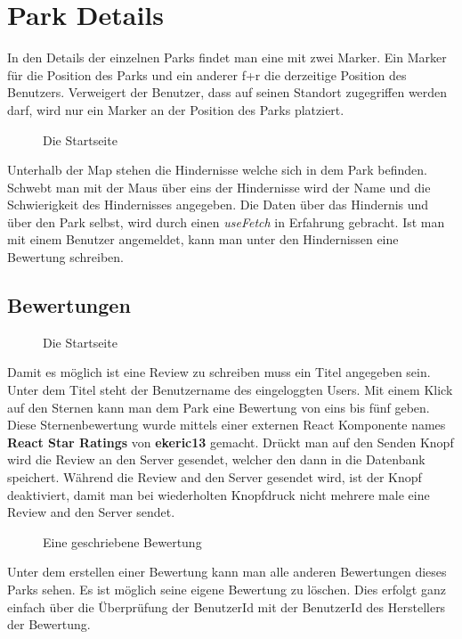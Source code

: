 \section{Park Details}
\label{parkDetails}

In den Details der einzelnen Parks findet man eine  mit zwei Marker. Ein Marker für die 
Position des Parks und ein anderer f+r die derzeitige Position des Benutzers. Verweigert der 
Benutzer, dass auf seinen Standort zugegriffen werden darf, wird nur ein Marker an der Position des
Parks platziert.

\begin{figure}[H]
    \begin{center}
      \caption{Die Startseite}
    \end{center}
\end{figure}

Unterhalb der Map stehen die Hindernisse welche sich in dem Park befinden. Schwebt man mit der Maus 
über eins der Hindernisse wird der Name und die Schwierigkeit des Hindernisses angegeben. Die Daten 
über das Hindernis und über den Park selbst, wird durch einen \textit{useFetch} in Erfahrung 
gebracht. Ist man mit einem Benutzer angemeldet, kann man unter den Hindernissen eine Bewertung 
schreiben.
\pagebreak
\subsection{Bewertungen}

\begin{figure}[H]
  \begin{center}
    \caption{Die Startseite}
  \end{center}
\end{figure}

Damit es möglich ist eine Review zu schreiben muss ein Titel angegeben sein. Unter dem Titel steht 
der Benutzername des eingeloggten Users. Mit einem Klick auf den Sternen kann man dem Park eine 
Bewertung von eins bis fünf geben. Diese Sternenbewertung wurde mittels einer externen React 
Komponente names \textbf{React Star Ratings} von \textbf{ekeric13} gemacht. Drückt man auf den 
Senden Knopf wird die Review an den Server gesendet, welcher den dann in die Datenbank speichert. 
Während die Review and den Server gesendet wird, ist der Knopf deaktiviert, damit man bei wiederholten 
Knopfdruck nicht mehrere male eine Review and den Server sendet.

\begin{figure}[H]
  \begin{center}
    \caption{Eine geschriebene Bewertung}
  \end{center}
\end{figure}

Unter dem erstellen einer Bewertung kann man alle anderen Bewertungen dieses Parks sehen. Es ist möglich 
seine eigene Bewertung zu löschen. Dies erfolgt ganz einfach über die Überprüfung der BenutzerId mit 
der BenutzerId des Herstellers der Bewertung.